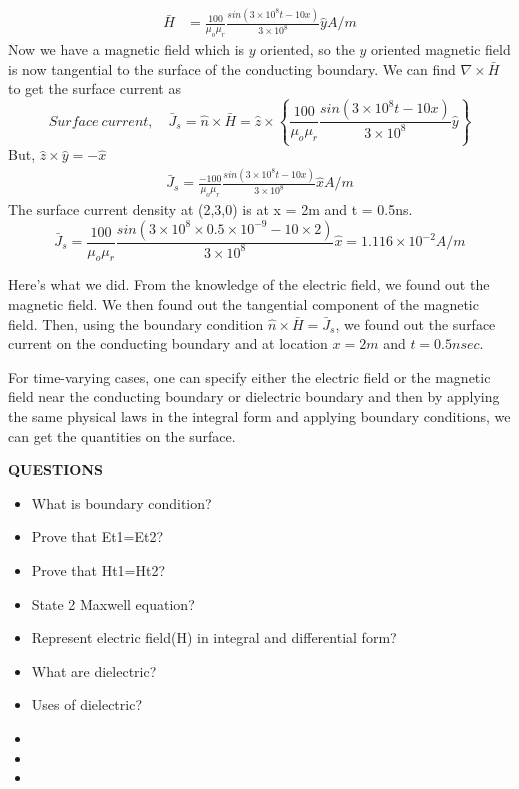 \begin{exmp}
\begin{align*}
\bar{H} &= \frac{100}{\mu_o\mu_r}\frac{sin(3\times 10^8t -10x)}{3\times 10^8}\hat{y} A/m
\end{align*}
Now we have a magnetic field which is $y$ oriented, so the $y$ oriented magnetic field is now tangential to the surface of the conducting boundary. We can find $\nabla\times\bar{H}$ to get the surface current as
\begin{dmath*}
Surface\ current,\quad \bar{J}_s = \hat{n}\times\bar{H} = \hat{z}\times \left\lbrace \frac{100}{\mu_o\mu_r}\frac{sin(3\times 10^8t -10x)}{3\times 10^8}\hat{y} \right\rbrace  
\end{dmath*}
But, $\hat{z}\times\hat{y} = -\hat{x}$
\begin{align*}
\bar{J}_s = \frac{-100}{\mu_o\mu_r}\frac{sin(3\times 10^8t -10x)}{3\times 10^8}\hat{x} A/m
\end{align*}
The surface current density at (2,3,0) is at x = 2m and t = 0.5ns.
\begin{dmath*}
\bar{J}_s = \frac{100}{\mu_o\mu_r}\frac{sin(3\times 10^8\times 0.5 \times 10^{-9} - 10\times 2)}{3\times 10^8}\hat{x} = 1.116\times 10^{-2} A/m
\end{dmath*}
\end{exmp} 
Here's what we did. From the knowledge of the electric field, we found out the magnetic field. We then found out the tangential component of the magnetic field. Then, using the boundary condition $\hat{n}\times\bar{H} = \bar{J}_s$, we found out the surface current on the conducting boundary and at location $x = 2m$ and $t = 0.5nsec$.

For time-varying cases, one can specify either the electric field or the magnetic field near the conducting boundary or dielectric boundary and then by applying the same physical laws in the integral form and applying boundary conditions, we can get the quantities on the surface.


\textbf{QUESTIONS}
\begin{itemize}
	
	\item What is boundary condition?
	\item Prove that Et1=Et2?
	\item Prove that Ht1=Ht2?
	\item State 2 Maxwell equation?
	\item Represent electric field(H) in integral and differential form?
	\item What are dielectric?
	\item Uses of dielectric?
	\item 
	\item 
	\item 
	
\end{itemize}
